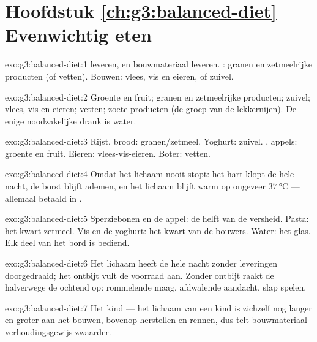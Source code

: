 \section*{Hoofdstuk \ref{ch:g3:balanced-diet} --- Evenwichtig eten}

\begin{solution}{exo:g3:balanced-diet:1}
 leveren, en bouwmateriaal leveren. : granen en
zetmeelrijke producten (of vetten). Bouwen: vlees, vis en eieren, of
zuivel.
\end{solution}

\begin{solution}{exo:g3:balanced-diet:2}
Groente en fruit; granen en zetmeelrijke producten; zuivel; vlees, vis
en eieren; vetten; zoete producten (de groep van de lekkernijen). De
enige noodzakelijke drank is water.
\end{solution}

\begin{solution}{exo:g3:balanced-diet:3}
Rijst, brood: granen/zetmeel. Yoghurt: zuivel. , appels: groente
en fruit. Eieren: vlees-vis-eieren. Boter: vetten.
\end{solution}

\begin{solution}{exo:g3:balanced-diet:4}
Omdat het lichaam nooit stopt: het hart klopt de hele nacht, de borst
blijft ademen, en het lichaam blijft warm op ongeveer
$\qty{37}{\degreeCelsius}$ --- allemaal betaald in .
\end{solution}

\begin{solution}{exo:g3:balanced-diet:5}
Sperziebonen en de appel: de helft van de versheid. Pasta: het kwart
zetmeel. Vis en de yoghurt: het kwart van de bouwers. Water: het glas.
Elk deel van het bord is bediend.
\end{solution}

\begin{solution}{exo:g3:balanced-diet:6}
Het lichaam heeft de hele nacht zonder leveringen doorgedraaid; het
ontbijt vult de voorraad aan. Zonder ontbijt raakt de  halverwege
de ochtend op: rommelende maag, afdwalende aandacht, slap spelen.
\end{solution}

\begin{solution}{exo:g3:balanced-diet:7}
Het kind --- het lichaam van een kind is zichzelf nog langer en groter
aan het bouwen, bovenop herstellen en rennen, dus telt bouwmateriaal
verhoudingsgewijs zwaarder.
\end{solution}

